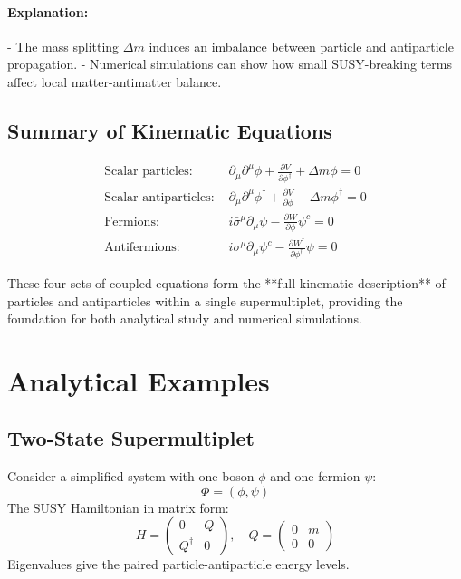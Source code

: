 \documentclass[12pt,a4paper]{article}
\begin{document}
\paragraph{Explanation:}  
- The mass splitting \(\Delta m\) induces an imbalance between particle and antiparticle propagation.  
- Numerical simulations can show how small SUSY-breaking terms affect local matter-antimatter balance.

\subsection{Summary of Kinematic Equations}

\begin{align}
\text{Scalar particles: } & \partial_\mu \partial^\mu \phi + \frac{\partial V}{\partial \phi^\dagger} + \Delta m \phi = 0 \\
\text{Scalar antiparticles: } & \partial_\mu \partial^\mu \phi^\dagger + \frac{\partial V}{\partial \phi} - \Delta m \phi^\dagger = 0 \\
\text{Fermions: } & i \bar\sigma^\mu \partial_\mu \psi - \frac{\partial W}{\partial \phi} \psi^c = 0 \\
\text{Antifermions: } & i \sigma^\mu \partial_\mu \psi^c - \frac{\partial W^\dagger}{\partial \phi^\dagger} \psi = 0
\end{align}

These four sets of coupled equations form the **full kinematic description** of particles and antiparticles within a single supermultiplet, providing the foundation for both analytical study and numerical simulations.

\section{Analytical Examples}
\subsection{Two-State Supermultiplet}
Consider a simplified system with one boson \(\phi\) and one fermion \(\psi\):
\[
\Phi = (\phi, \psi)
\]
The SUSY Hamiltonian in matrix form:
\[
H = \begin{pmatrix}
0 & Q \\
Q^\dagger & 0
\end{pmatrix}, \quad Q = \begin{pmatrix} 0 & m \\ 0 & 0 \end{pmatrix}
\]
Eigenvalues give the paired particle-antiparticle energy levels.
\end{document}
